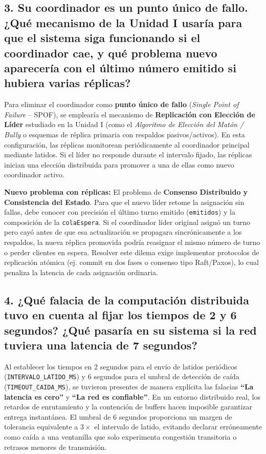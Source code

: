 \documentclass[10pt,a4paper]{article}
\begin{document}
\subsection*{3. Su coordinador es un punto único de fallo. ¿Qué mecanismo de la Unidad I usaría para que el sistema siga funcionando si el coordinador cae, y qué problema nuevo aparecería con el último número emitido si hubiera varias réplicas?}
Para eliminar el coordinador como \textbf{punto único de fallo} (\textit{Single Point of Failure} -- SPOF), se emplearía el mecanismo de \textbf{Replicación con Elección de Líder} estudiado en la Unidad I (como el \textit{Algoritmo de Elección del Matón / Bully} o esquemas de réplica primaria con respaldos pasivos/activos). En esta configuración, las réplicas monitorean periódicamente al coordinador principal mediante latidos. Si el líder no responde durante el intervalo fijado, las réplicas inician una elección distribuida para promover a una de ellas como nuevo coordinador activo.

\textbf{Nuevo problema con réplicas:} El problema de \textbf{Consenso Distribuido y Consistencia del Estado}. Para que el nuevo líder retome la asignación sin fallas, debe conocer con precisión el último turno emitido (\texttt{emitidos}) y la composición de la \texttt{colaEspera}. Si el coordinador líder original asignó un turno pero cayó antes de que esa actualización se propagara sincrónicamente a los respaldos, la nueva réplica promovida podría reasignar el mismo número de turno o perder clientes en espera. Resolver este dilema exige implementar protocolos de replicación atómica (ej. commit en dos fases o consenso tipo Raft/Paxos), lo cual penaliza la latencia de cada asignación ordinaria.

\subsection*{4. ¿Qué falacia de la computación distribuida tuvo en cuenta al fijar los tiempos de 2 y 6 segundos? ¿Qué pasaría en su sistema si la red tuviera una latencia de 7 segundos?}
Al establecer los tiempos en 2 segundos para el envío de latidos periódicos (\texttt{INTERVALO\_LATIDO\_MS}) y 6 segundos para el umbral de detección de caída (\texttt{TIMEOUT\_CAIDA\_MS}), se tuvieron presentes de manera explícita las falacias \textbf{``La latencia es cero''} y \textbf{``La red es confiable''}. En un entorno distribuido real, los retardos de enrutamiento y la contención de buffers hacen imposible garantizar entrega instantánea. El umbral de 6 segundos proporciona un margen de tolerancia equivalente a $3 \times$ el intervalo de latido, evitando declarar erróneamente como caída a una ventanilla que solo experimenta congestión transitoria o retrasos menores de transmisión.
\end{document}
